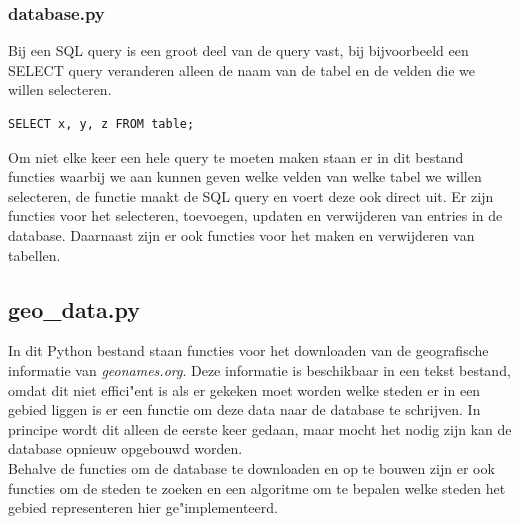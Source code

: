 \documentclass[twoside,openright]{uva-bachelor-thesis}
\begin{document}
			\subsubsection{database.py}
			Bij een SQL query is een groot deel van de query vast, bij bijvoorbeeld een SELECT query veranderen alleen de naam van de tabel en de velden die we willen selecteren.
\begin{verbatim}
SELECT x, y, z FROM table;
\end{verbatim}
			Om niet elke keer een hele query te moeten maken staan er in dit bestand functies waarbij we aan kunnen geven welke velden van welke tabel we willen selecteren, de functie maakt de SQL query en voert deze ook direct uit. Er zijn functies voor het selecteren, toevoegen, updaten en verwijderen van entries in de database. Daarnaast zijn er ook functies voor het maken en verwijderen van tabellen.
		\subsection{geo\_data.py}
		In dit Python bestand staan functies voor het downloaden van de geografische informatie van \textit{geonames.org}. Deze informatie is beschikbaar in een tekst bestand, omdat dit niet effici"ent is als er gekeken moet worden welke steden er in een gebied liggen is er een functie om deze data naar de database te schrijven. In principe wordt dit alleen de eerste keer gedaan, maar mocht het nodig zijn kan de database opnieuw opgebouwd worden.\\[0.5cm]
		Behalve de functies om de database te downloaden en op te bouwen zijn er ook functies om de steden te zoeken en een algoritme om te bepalen welke steden het gebied representeren hier ge"implementeerd.
\end{document}
